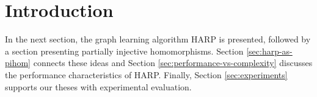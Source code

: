 \section{Introduction}

In the next section, the graph learning algorithm HARP is presented, followed by a section presenting partially injective homomorphisms. Section \ref{sec:harp-as-pihom} connects these ideas and Section \ref{sec:performance-vs-complexity} discusses the performance characteristics of HARP. Finally, Section \ref{sec:experiments} supports our theses with experimental evaluation.
